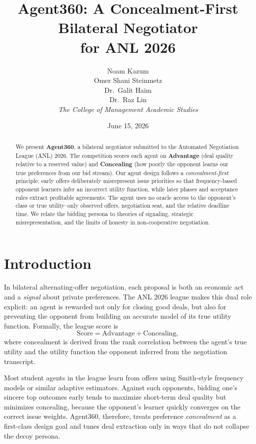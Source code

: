 \documentclass[11pt]{article}
\title{Agent360: A Concealment-First Bilateral Negotiator\\for ANL 2026}
\author{%
  Noam Kazum \\[0.4em]
  Omer Shani Steinmetz \\[0.4em]
  Dr.~Galit Haim \\[0.4em]
  Dr.~Raz Lin \\[1em]
  \textit{The College of Management Academic Studies}%
}
\date{June 15, 2026}
\begin{document}
\maketitle

\begin{abstract}
We present \textbf{Agent360}, a bilateral negotiator submitted to the Automated Negotiation
League (ANL) 2026.
The competition scores each agent on \textbf{Advantage} (deal quality relative to a reserved
value) and \textbf{Concealing} (how poorly the opponent learns our true preferences from our
bid stream).
Our agent design follows a \emph{concealment-first} principle: early offers
deliberately misrepresent issue priorities so that frequency-based opponent learners infer an
incorrect utility function, while later phases and acceptance rules extract profitable
agreements.
The agent uses no oracle access to the opponent's class or true utility--only observed offers,
negotiation seat, and the relative deadline time.
We relate the bidding persona to theories of signaling, strategic misrepresentation, and the
limits of honesty in non-cooperative negotiation.
\end{abstract}

\section{Introduction}

In bilateral alternating-offer negotiation, each proposal is both an economic act and a
\emph{signal} about private preferences.
The ANL 2026 league makes this dual role explicit: an agent is rewarded not only for closing
good deals, but also for preventing the opponent from building an accurate model of its true
utility function.
Formally, the league score is
\begin{equation}
  \text{Score} = \text{Advantage} + \text{Concealing},
\end{equation}
where concealment is derived from the rank correlation between the agent's true utility and the
utility function the opponent inferred from the negotiation transcript.

Most student agents in the league learn from offers using Smith-style frequency models or
similar adaptive estimators.
Against such opponents, bidding one's sincere top outcomes early tends to maximize short-term
deal quality but minimizes concealing, because the opponent's learner quickly converges on the
correct issue weights.
Agent360, therefore, treats preference \emph{concealment} as a first-class design goal and tunes deal extraction only in ways that do not collapse the decoy persona.
\end{document}
